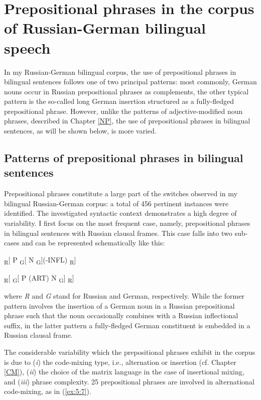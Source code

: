 \section{Prepositional phrases in the corpus of Russian-German bilingual speech}
In my Russian-German bilingual corpus, the use of prepositional phrases in bilingual sentences follows one of two principal patterns: most commonly, German nouns occur in Russian prepositional phrases as complements, the other typical pattern is the so-called long German insertion structured as a fully-fledged prepositional phrase.  However, unlike the patterns of adjective-modified noun phrases, described in Chapter \ref{NP}, the use of prepositional phrases in bilingual sentences, as will be shown below, is more varied.

\subsection{Patterns of prepositional phrases in bilingual sentences}
\label{sec:PP sample}

\noindent Prepositional phrases constitute a large part of the switches observed in my bilingual Russian-German corpus: a total of 456 pertinent instances were identified. The investigated syntactic context demonstrates a high degree of variability. I first focus on the most frequent case, namely, prepositional phrases in bilingual sentences with Russian clausal frames. This case falls into two sub-cases and can be represented schematically like this:

\ea
\label{ex:5:6}
\textsubscript{R}[ P \textsubscript{G}[ N \textsubscript{G}](-INFL) \textsubscript{R}]

\textsubscript{R}[ \textsubscript{G}[ P (ART) N \textsubscript{G}] \textsubscript{R}]
\z

\noindent where \textit{R} and \textit{G} stand for Russian and German, respectively. While the former pattern involves the insertion of a German noun in a Russian prepositional phrase such that the noun  occasionally combines with a Russian inflectional suffix, in the latter pattern a fully-fledged German constituent is embedded in a Russian clausal frame.

The considerable variability which the prepositional phrases exhibit in the corpus is due to (\textit{i}) the code-mixing type, i.e., alternation or insertion (cf. Chapter \ref{CM}), (\textit{ii}) the choice of the matrix language in the case of insertional mixing, and (\textit{iii}) phrase complexity. 25 prepositional phrases are involved in alternational code-mixing, as in (\ref{ex:5:7}).

